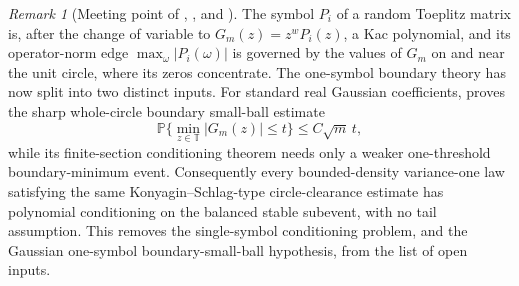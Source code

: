 \documentclass[11pt]{amsart}
\numberwithin{equation}{section}
\theoremstyle{definition}
\theoremstyle{remark}
\newtheorem{remark}[theorem]{Remark}
\newcommand{\T}{\mathbb T}
\newcommand{\Prob}{\mathbb P}
\newcommand{\abs}[1]{\left\lvert #1\right\rvert}
\begin{document}
\begin{remark}[Meeting point of \cite{Shmalo-paper5}, \cite{Shmalo-paper12}, and \cite{Shmalo-paper16}]
\label{rem:meeting}
The symbol $P_i$ of a random Toeplitz matrix is, after the change of variable to
$G_m(z)=z^{w}P_i(z)$, a Kac polynomial, and its operator-norm edge
$\max_\omega\abs{P_i(\omega)}$ is governed by the values of $G_m$ on and near the
unit circle, where its zeros concentrate.  The one-symbol boundary theory has
now split into two distinct inputs.  For standard real Gaussian coefficients,
\cite{Shmalo-paper16} proves the sharp whole-circle boundary small-ball estimate
\[
  \Prob\{\min_{z\in\T}\abs{G_m(z)}\le t\}\le C\sqrt m\,t,
\]
while its finite-section conditioning theorem needs only a weaker
one-threshold boundary-minimum event.  Consequently every bounded-density
variance-one law satisfying the same Konyagin--Schlag-type circle-clearance
estimate has polynomial conditioning on the balanced stable subevent, with no
tail assumption.  This removes the single-symbol conditioning problem, and the
Gaussian one-symbol boundary-small-ball hypothesis, from the list of open inputs.


\end{remark}
\end{document}
